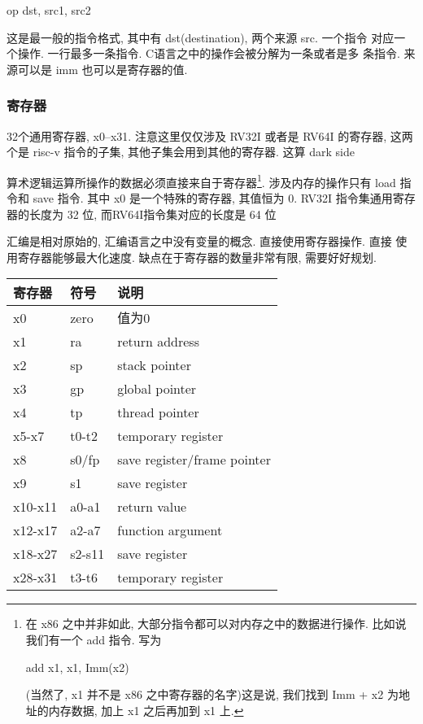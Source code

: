 \documentclass[11pt]{article}
\begin{document}
op dst, src1, src2

这是最一般的指令格式, 其中有 dst(destination), 两个来源 src. 一个指令
对应一个操作. 一行最多一条指令. C语言之中的操作会被分解为一条或者是多
条指令. 来源可以是 imm 也可以是寄存器的值. 

\subsubsection{寄存器}
\label{sec:org85acf5b}

32个通用寄存器, x0--x31. 注意这里仅仅涉及 RV32I 或者是 RV64I 的寄存器,
这两个是 risc-v 指令的子集, 其他子集会用到其他的寄存器. 这算 dark side

算术逻辑运算所操作的数据必须直接来自于寄存器\footnote{在 x86 之中并非如此, 大部分指令都可以对内存之中的数据进行操作.
比如说我们有一个 add 指令. 写为 

add x1, x1, Imm(x2)

(当然了, x1 并不是 x86 之中寄存器的名字)这是说, 我们找到 Imm + x2 为地
址的内存数据, 加上 x1 之后再加到 x1 上.}. 涉及内存的操作只有
load 指令和 save 指令. 其中 x0 是一个特殊的寄存器, 其值恒为 0. RV32I
指令集通用寄存器的长度为 32 位, 而RV64I指令集对应的长度是 64 位

汇编是相对原始的, 汇编语言之中没有变量的概念. 直接使用寄存器操作. 直接
使用寄存器能够最大化速度. 缺点在于寄存器的数量非常有限, 需要好好规划. 


\begin{center}
\begin{tabular}{lll}
\hline
寄存器 & 符号 & 说明\\
\hline
x0 & zero & 值为0\\
x1 & ra & return address\\
x2 & sp & stack pointer\\
x3 & gp & global pointer\\
x4 & tp & thread pointer\\
x5-x7 & t0-t2 & temporary register\\
x8 & s0/fp & save register/frame pointer\\
x9 & s1 & save register\\
x10-x11 & a0-a1 & return value\\
x12-x17 & a2-a7 & function argument\\
x18-x27 & s2-s11 & save register\\
x28-x31 & t3-t6 & temporary register\\
\hline
\end{tabular}
\end{center}
\end{document}
